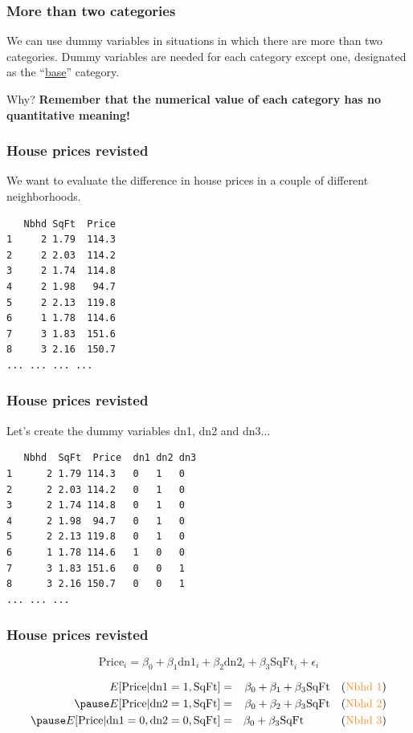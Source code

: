 \documentclass{beamer}
\newcommand{\bo}[1]{\textcolor{burntorange}{#1}}
\newcommand{\sk}{\vspace{.5cm}}
\begin{document}
\begin{frame}
\frametitle{More than two categories}

\sk
We can use \bo{dummy variables} in situations in which there are more than two categories. Dummy variables are needed for each category except one, designated as the ``\underline{base}'' category.

\sk\sk

		{\color{lightblue}Why? {\bf Remember that the numerical value of each category has no quantitative meaning!}}

\sk

\end{frame}


\begin{frame}[containsverbatim]
\frametitle{House prices revisted}
We want to evaluate the difference in house prices in a couple of different neighborhoods. 


\begin{verbatim}
   Nbhd SqFt  Price
1     2 1.79  114.3
2     2 2.03  114.2
3     2 1.74  114.8
4     2 1.98   94.7
5     2 2.13  119.8
6     1 1.78  114.6
7     3 1.83  151.6
8     3 2.16  150.7
... ... ... ... 

\end{verbatim}

\end{frame}
\begin{frame}[containsverbatim]
\frametitle{House prices revisted}
Let's create the {\color{lightblue}dummy variables} dn1, dn2 and dn3... 
 \begin{verbatim}
   Nbhd  SqFt  Price  dn1 dn2 dn3
1      2 1.79 114.3   0   1   0
2      2 2.03 114.2   0   1   0
3      2 1.74 114.8   0   1   0
4      2 1.98  94.7   0   1   0
5      2 2.13 119.8   0   1   0
6      1 1.78 114.6   1   0   0
7      3 1.83 151.6   0   0   1
8      3 2.16 150.7   0   0   1
... ... ... 
\end{verbatim}
\end{frame}
\begin{frame}
\frametitle{House prices revisted}
$$
\text{Price}_i = \beta_0 + \beta_1 \text{dn1}_i + \beta_2 \text{dn2}_i + \beta_3 \text{SqFt}_i + \epsilon_i
$$

\begin{eqnarray*}
E[\text{Price}|\text{dn1}=1,\text{SqFt}] &=& \beta_0 + \beta_1 + \beta_3 \text{SqFt} \quad \mbox{(\bo{Nbhd 1})} \\ \pause 
E[\text{Price}|\text{dn2}=1,\text{SqFt}] &=& \beta_0 + \beta_2 + \beta_3 \text{SqFt} \quad \mbox{(\bo{Nbhd 2})} \\ \pause 
E[\text{Price}|\text{dn1}=0,\text{dn2}=0,\text{SqFt}] &=& \beta_0 +\beta_3 \text{SqFt} \quad \quad \quad \ \mbox{(\bo{Nbhd 3})} \\
\end{eqnarray*}
\end{frame}
\end{document}
